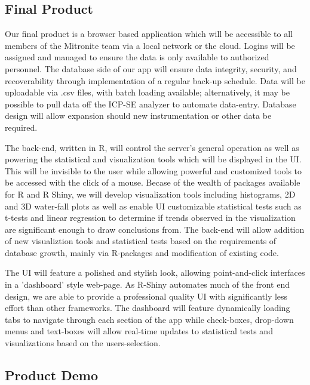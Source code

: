 \documentclass[10pt,twocolumn,letterpaper]{article}
\begin{document}
            \subsection{Final Product}

            Our final product is a browser based application which will be accessible to all members of the Mitronite team via a local network or the cloud. Logins will be assigned and managed to ensure the data is only available to authorized personnel. The database side of our app will ensure data integrity, security, and recoverability through implementation of a regular back-up schedule. Data will be uploadable via .csv files, with batch loading available; alternatively, it may be possible to pull data off the ICP-SE analyzer to automate data-entry. Database design will allow expansion should new instrumentation or other data be required.

            The back-end, written in R, will control the server's general operation as well as powering the statistical and visualization tools which will be displayed in the UI. This will be invisible to the user while allowing powerful and customized tools to be accessed with the click of a mouse. Becase of the wealth of packages available for R and R Shiny, we will develop visualization tools including histograms, 2D and 3D water-fall plots as well as enable UI customizable statistical tests such as t-tests and linear regression to determine if trends observed in the visualization are significant enough to draw conclusions from. The back-end will allow addition of new visualiztion tools and statistical tests based on the requirements of database growth, mainly via R-packages and modification of existing code.


            The UI will feature a polished and stylish look, allowing point-and-click interfaces in a 'dashboard' style web-page. As R-Shiny automates much of the front end design, we are able to provide a professional quality UI with significantly less effort than other frameworks. The dashboard will feature dynamically loading tabs to navigate through each section of the app while check-boxes, drop-down menus and text-boxes will allow real-time updates to statistical tests and visualizations based on the users-selection.

            \subsection{Product Demo}
\end{document}
